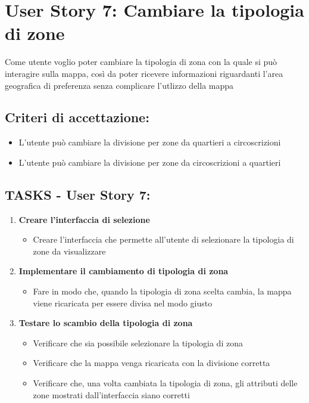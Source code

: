 \section*{User Story 7: Cambiare la tipologia di zone}  
    Come utente voglio poter cambiare la tipologia di zona con la quale si può interagire sulla mappa, così da poter ricevere informazioni riguardanti l'area geografica di preferenza senza complicare l'utlizzo della mappa
    \subsection*{Criteri di accettazione:}  
    \begin{itemize}  
        \item L'utente può cambiare la divisione per zone da quartieri a circoscrizioni
        \item L'utente può cambiare la divisione per zone da circoscrizioni a quartieri
    \end{itemize}  
    \subsection*{TASKS - User Story 7:}  
    \begin{enumerate}  
        \item \textbf{Creare l'interfaccia di selezione}  
            \begin{itemize}  
                \item Creare l'interfaccia che permette all'utente di selezionare la tipologia di zone da visualizzare
            \end{itemize}  
        \item \textbf{Implementare il cambiamento di tipologia di zona}  
            \begin{itemize}  
                \item Fare in modo che, quando la tipologia di zona scelta cambia, la mappa viene ricaricata per essere divisa nel modo giusto
            \end{itemize}  
        \item \textbf{Testare lo scambio della tipologia di zona}  
            \begin{itemize}  
                \item Verificare che sia possibile selezionare la tipologia di zona
                \item Verificare che la mappa venga ricaricata con la divisione corretta
                \item Verificare che, una volta cambiata la tipologia di zona, gli attributi delle zone mostrati dall'interfaccia siano corretti
            \end{itemize}  
    \end{enumerate}
